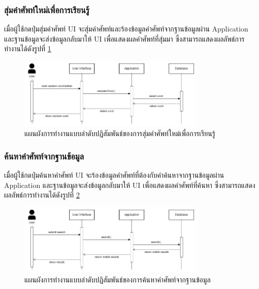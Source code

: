 \documentclass[12pt,oneside,openright,a4paper]{cpe-thai-project}
\begin{document}
\subsubsection{สุ่มคำศัพท์ใหม่เพื่อการเรียนรู้}
\hspace{1cm}
เมื่อผู้ใช้กดปุ่มสุ่มคำศัพท์ UI จะสุ่มคำศัพท์และร้องข้อมูลคำศัพท์จากฐานข้อมูลผ่าน Application
และฐานข้อมูลจะส่งข้อมูลกลับมาให้ UI เพื่อแสดงผลคำศัพท์ที่สุ่มมา ซึ่งสามารถแสดงผลลัพธ์การทำงานได้ดังรูปที่ \ref{fig:S_RandomWord}
\begin{figure}[!h]\centering
	\includegraphics[width=0.8\textwidth, keepaspectratio=true]{image/chap3/sequence/Random word.jpg}
	\caption{แผนผังการทำงานแบบลำดับปฏิสัมพันธ์ของการสุ่มคำศัพท์ใหม่เพื่อการเรียนรู้}\label{fig:S_RandomWord}
\end{figure}

\pagebreak
\subsubsection{ค้นหาคำศัพท์จากฐานข้อมูล}
\hspace{1cm}
เมื่อผู้ใช้กดปุ่มค้นหาคำศัพท์ UI จะร้องข้อมูลคำศัพท์ที่ต้องกับคำค้นหาจากฐานข้อมูลผ่าน Application
และฐานข้อมูลจะส่งข้อมูลกลับมาให้ UI เพื่อแสดงผลคำศัพท์ที่ค้นหา ซึ่งสามารถแสดงผลลัพธ์การทำงานได้ดังรูปที่ \ref{fig:S_SearchWord}
\begin{figure}[!h]\centering
	\includegraphics[width=0.8\textwidth, keepaspectratio=true]{image/chap3/sequence/Search.jpg}
	\caption{แผนผังการทำงานแบบลำดับปฏิสัมพันธ์ของการค้นหาคำศัพท์จากฐานข้อมูล}\label{fig:S_SearchWord}
\end{figure}
\end{document}

